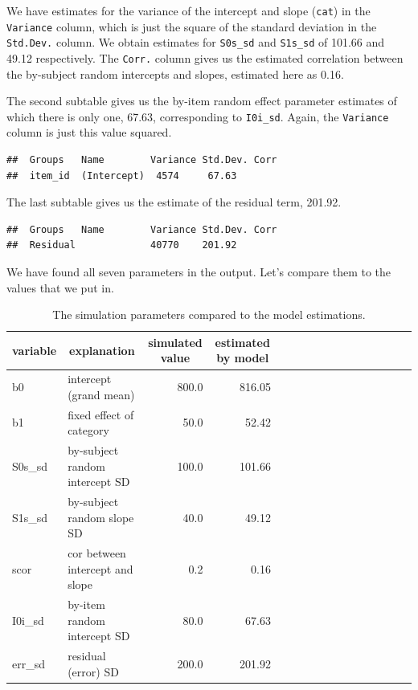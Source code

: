 \documentclass[doc,floatsintext]{apa6}
\begin{document}
\noindent We have estimates for the variance of the intercept and slope
(\texttt{cat}) in the \texttt{Variance} column, which is just the square
of the standard deviation in the \texttt{Std.Dev.} column. We obtain
estimates for \texttt{S0s\_sd} and \texttt{S1s\_sd} of 101.66 and 49.12
respectively. The \texttt{Corr.} column gives us the estimated
correlation between the by-subject random intercepts and slopes,
estimated here as 0.16.

The second subtable gives us the by-item random effect parameter
estimates of which there is only one, 67.63, corresponding to
\texttt{I0i\_sd}. Again, the \texttt{Variance} column is just this value
squared.

\begin{verbatim}
##  Groups   Name        Variance Std.Dev. Corr
##  item_id  (Intercept)  4574     67.63
\end{verbatim}

The last subtable gives us the estimate of the residual term, 201.92.

\begin{verbatim}
##  Groups   Name        Variance Std.Dev. Corr
##  Residual             40770    201.92
\end{verbatim}

We have found all seven parameters in the output. Let's compare them to
the values that we put in.

\begin{table}[H]
\begin{center}
\begin{threeparttable}
\caption{\label{tab:param-compare}The simulation parameters compared to the model estimations.}
\begin{tabular}{llrrllrrllrrllrr}
\toprule
variable & \multicolumn{1}{c}{explanation} & \multicolumn{1}{c}{simulated value} & \multicolumn{1}{c}{estimated by model}\\
\midrule
b0 & intercept (grand mean) & 800.0 & 816.05\\
b1 & fixed effect of category & 50.0 & 52.42\\
S0s\_sd & by-subject random intercept SD & 100.0 & 101.66\\
S1s\_sd & by-subject random slope SD & 40.0 & 49.12\\
scor & cor between intercept and slope & 0.2 & 0.16\\
I0i\_sd & by-item random intercept SD & 80.0 & 67.63\\
err\_sd & residual (error) SD & 200.0 & 201.92\\
\bottomrule
\end{tabular}
\end{threeparttable}
\end{center}
\end{table}
\end{document}
